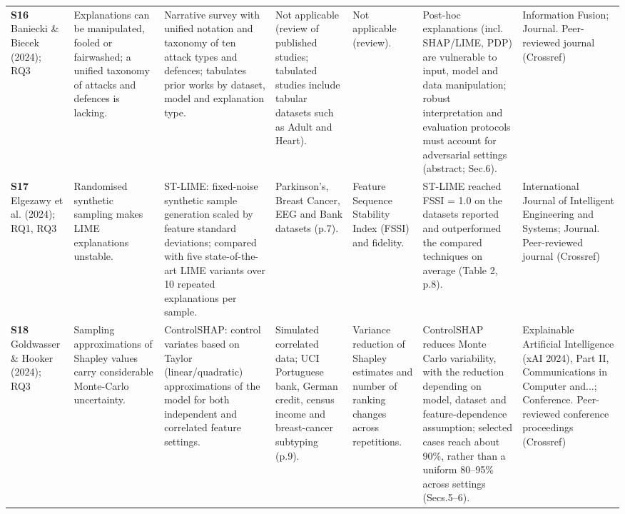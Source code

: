\begin{longtable}{@{}P{1.55cm}P{2.9cm}P{4.5cm}P{3.2cm}P{3.4cm}P{4.6cm}P{3.6cm}@{}}
\textbf{S16} \cite{S16} Baniecki \& Biecek (2024); RQ3 & Explanations can be manipulated, fooled or fairwashed; a unified taxonomy of attacks and defences is lacking. & Narrative survey with unified notation and taxonomy of ten attack types and defences; tabulates prior works by dataset, model and explanation type. & Not applicable (review of published studies; tabulated studies include tabular datasets such as Adult and Heart). & Not applicable (review). & Post-hoc explanations (incl. SHAP/\allowbreak{}LIME, PDP) are vulnerable to input, model and data manipulation; robust interpretation and evaluation protocols must account for adversarial settings (abstract; Sec.6). & Information Fusion; Journal. Peer-reviewed journal (Crossref) \\
\textbf{S17} \cite{S17} Elgezawy et al. (2024); RQ1, RQ3 & Randomised synthetic sampling makes LIME explanations unstable. & ST-LIME: fixed-noise synthetic sample generation scaled by feature standard deviations; compared with five state-of-the-art LIME variants over 10 repeated explanations per sample. & Parkinson's, Breast Cancer, EEG and Bank datasets (p.7). & Feature Sequence Stability Index (FSSI) and fidelity. & ST-LIME reached FSSI = 1.0 on the datasets reported and outperformed the compared techniques on average (Table 2, p.8). & International Journal of Intelligent Engineering and Systems; Journal. Peer-reviewed journal (Crossref) \\
\textbf{S18} \cite{S18} Goldwasser \& Hooker (2024); RQ3 & Sampling approximations of Shapley values carry considerable Monte-Carlo uncertainty. & ControlSHAP: control variates based on Taylor (linear/\allowbreak{}quadratic) approximations of the model for both independent and correlated feature settings. & Simulated correlated data; UCI Portuguese bank, German credit, census income and breast-cancer subtyping (p.9). & Variance reduction of Shapley estimates and number of ranking changes across repetitions. & ControlSHAP reduces Monte Carlo variability, with the reduction depending on model, dataset and feature-dependence assumption; selected cases reach about 90\%, rather than a uniform 80--95\% across settings (Secs.5--6). & Explainable Artificial Intelligence (xAI 2024), Part II, Communications in Computer and...; Conference. Peer-reviewed conference proceedings (Crossref) \\

\end{longtable}
